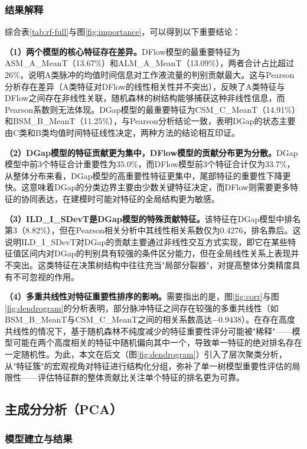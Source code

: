\documentclass[UTF8,a4paper,12pt]{ctexart}
\begin{document}
\subsubsection{结果解释}

综合表\ref{tab:rf-full}与图\ref{fig:importance}，可以得到以下重要结论：

\textbf{（1）两个模型的核心特征存在差异。}DFlow模型的最重要特征为ASM\_A\_MeanT（13.67\%）和ALM\_A\_MeanT（13.09\%），两者合计占比超过26\%，说明A类脉冲的均值时间信息对工作液流量的判别贡献最大。这与Pearson分析存在差异（A类特征对DFlow的线性相关性并不突出），反映了A类特征与DFlow之间存在非线性关联，随机森林的树结构能够捕获这种非线性信息，而Pearson系数则无法体现。DGap模型的最重要特征为CSM\_C\_MeanT（14.91\%）和BSM\_B\_MeanT（11.25\%），与Pearson分析结论一致，表明DGap的状态主要由C类和B类均值时间特征线性决定，两种方法的结论相互印证。

\textbf{（2）DGap模型的特征贡献更为集中，DFlow模型的贡献分布更为分散。}DGap模型中前3个特征合计重要性为35.0\%，而DFlow模型前3个特征合计仅为33.7\%，从整体分布来看，DGap模型的高重要性特征更集中，尾部特征的重要性下降更快。这意味着DGap的分类边界主要由少数关键特征决定，而DFlow则需要更多特征的协同表达，在建模时可能对特征的全局结构更为敏感。

\textbf{（3）ILD\_I\_SDevT是DGap模型的特殊贡献特征。}该特征在DGap模型中排名第3（8.82\%），但在Pearson相关分析中其线性相关系数仅为0.4276，排名靠后。这说明ILD\_I\_SDevT对DGap的贡献主要通过非线性交互方式实现，即它在某些特征值区间内对DGap的判别具有较强的条件区分能力，但在全局线性关系上表现并不突出。这类特征在决策树结构中往往充当"局部分裂器"，对提高整体分类精度具有不可忽视的作用。

\textbf{（4）多重共线性对特征重要性排序的影响。}需要指出的是，图\ref{fig:corr}与图\ref{fig:dendrogram}的分析表明，部分脉冲特征之间存在较强的多重共线性（如BSM\_B\_MeanT与CSM\_C\_MeanT之间的相关系数高达$-0.9438$）。在存在高度共线性的情况下，基于随机森林不纯度减少的特征重要性评分可能被"稀释"——模型可能在两个高度相关的特征中随机偏向其中一个，导致单一特征的绝对排名存在一定随机性。为此，本文在后文（图\ref{fig:dendrogram}）引入了层次聚类分析，从"特征簇"的宏观视角对特征进行结构化分组，弥补了单一树模型重要性评估的局限性——评估特征群的整体贡献比关注单个特征的排名更为可靠。

\subsection{主成分分析（PCA）}

\subsubsection{模型建立与结果}
\end{document}
